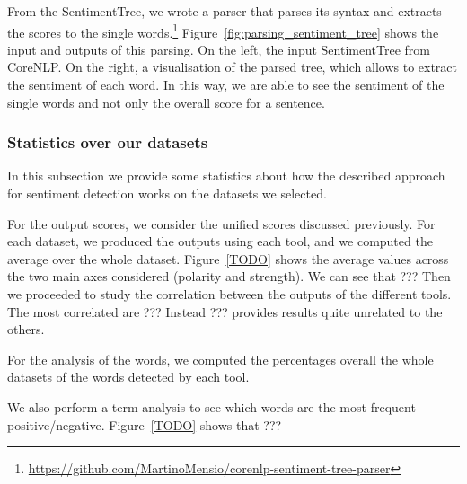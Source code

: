 From the SentimentTree, we wrote a parser that parses its syntax and extracts the scores to the single words.\footnote{\url{https://github.com/MartinoMensio/corenlp-sentiment-tree-parser}}
Figure~\ref{fig:parsing_sentiment_tree} shows the input and outputs of this parsing. On the left, the input SentimentTree from CoreNLP. On the right, a visualisation of the parsed tree, which allows to extract the sentiment of each word.
In this way, we are able to see the sentiment of the single words and not only the overall score for a sentence.


\subsubsection{\statusred Statistics over our datasets}
In this subsection we provide some statistics about how the described approach for sentiment detection works on the datasets we selected.


For the output scores, we consider the unified scores discussed previously. For each dataset, we produced the outputs using each tool, and we computed the average over the whole dataset.
Figure~\ref{TODO} shows the average values across the two main axes considered (polarity and strength). We can see that ???
Then we proceeded to study the correlation between the outputs of the different tools.
The most correlated are ???
Instead ??? provides results quite unrelated to the others.

For the analysis of the words, we computed the percentages overall the whole datasets of the words detected by each tool.

We also perform a term analysis to see which words are the most frequent positive/negative. Figure~\ref{TODO} shows that ???

